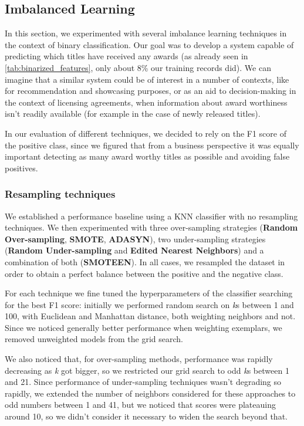 \subsection{Imbalanced Learning}

In this section, we experimented with several imbalance learning techniques in the context of binary classification.
Our goal was to develop a system capable of predicting which titles have received any awards (as already seen in \ref{tab:binarized_features}, only about 8\% our training records did).
We can imagine that a similar system could be of interest in a number of contexts, like for recommendation and showcasing purposes, or as an aid to decision-making in the context of licensing agreements, when information about award worthiness isn't readily available (for example in the case of newly released titles).

In our evaluation of different techniques, we decided to rely on the F1 score of the positive class, since we figured that from a business perspective it was equally important detecting as many award worthy titles as possible and avoiding false positives.

\subsubsection{Resampling techniques}

We established a performance baseline using a KNN classifier with no resampling techniques.
We then experimented with three over-sampling strategies (\textbf{Random Over-sampling}, \textbf{SMOTE}, \textbf{ADASYN}), two under-sampling strategies (\textbf{Random Under-sampling} and \textbf{Edited Nearest Neighbors}) and a combination of both (\textbf{SMOTEEN}). In all cases, we resampled the dataset in order to obtain a perfect balance between the positive and the negative class.

For each technique we fine tuned the hyperparameters of the classifier searching for the best F1 score: initially we performed random search on \emph{k}s between 1 and 100, with Euclidean and Manhattan distance, both weighting neighbors and not. Since we noticed generally better performance when weighting exemplars, we removed unweighted models from the grid search.

We also noticed that, for over-sampling methods, performance was rapidly decreasing as \textit{k} got bigger, so we restricted our grid search to odd \textit{k}s between 1 and 21. Since performance of under-sampling techniques wasn't degrading so rapidly, we extended the number of neighbors considered for these approaches to odd numbers between 1 and 41, but we noticed that scores were plateauing around 10, so we didn't consider it necessary to widen the search beyond that.

